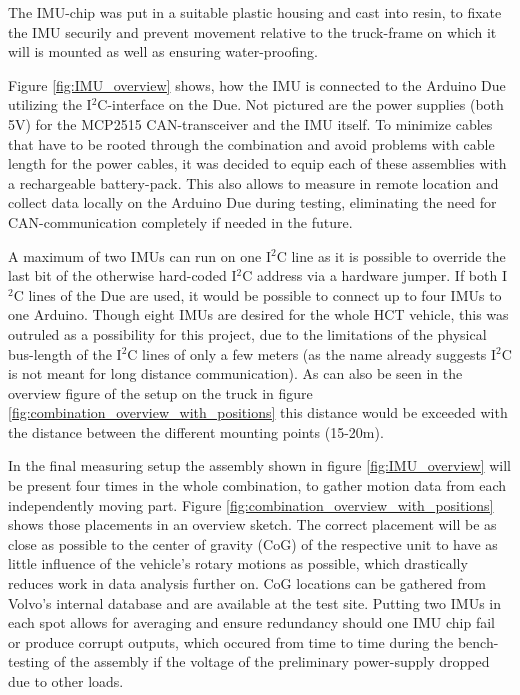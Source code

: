 \documentclass[ExampleMasters.tex]{subfiles}
\begin{document}
The IMU-chip was put in a suitable plastic housing and cast into resin, to fixate the IMU securily and prevent movement relative to the truck-frame on which it will is mounted as well as ensuring water-proofing.

Figure \ref{fig:IMU_overview} shows, how the IMU is connected to the Arduino Due utilizing the I$^{2}$C-interface on the Due. Not pictured are the power supplies (both 5V) for the MCP2515 CAN-transceiver and the IMU itself. To minimize cables that have to be rooted through the combination and avoid problems with cable length for the power cables, it was decided to equip each of these assemblies with a rechargeable battery-pack. This also allows to measure in remote location and collect data locally on the Arduino Due during testing, eliminating the need for CAN-communication completely if needed in the future.

A maximum of two IMUs can run on one I$^{2}$C line as it is possible to override the last bit of the otherwise hard-coded I$^{2}$C address via a hardware jumper. If both I$^{2}$C lines of the Due are used, it would be possible to connect up to four IMUs to one Arduino. Though eight IMUs are desired for the whole HCT vehicle, this was outruled as a possibility for this project, due to the limitations of the physical bus-length of the I$^{2}$C lines of only a few meters (as the name already suggests I$^{2}$C is not meant for long distance communication). As can also be seen in the overview figure of the setup on the truck in figure \ref{fig:combination_overview_with_positions} this distance would be exceeded with the distance between the different mounting points (15-20m).

In the final measuring setup the assembly shown in figure \ref{fig:IMU_overview} will be present four times in the whole combination, to gather motion data from each independently moving part. Figure \ref{fig:combination_overview_with_positions} shows those placements in an overview sketch. The correct placement will be as close as possible to the center of gravity (CoG) of the respective unit to have as little influence of the vehicle's rotary motions as possible, which drastically reduces work in  data analysis further on. CoG locations can be gathered from Volvo's internal database and are available at the test site. Putting two IMUs in each spot allows for averaging and ensure redundancy should one IMU chip fail or produce corrupt outputs, which occured from time to time during the bench-testing of the assembly if the voltage of the preliminary power-supply dropped due to other loads.
\end{document}
